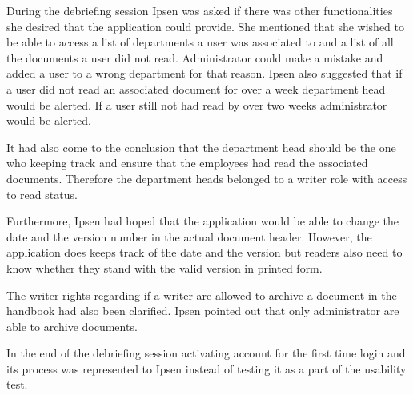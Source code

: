 
During the debriefing session Ipsen was asked if there was other functionalities she desired that the application could provide.
She mentioned that she wished to be able to access a list of departments a user was associated to and a list of all the documents a user did not read. 
Administrator could make a mistake and added a user to a wrong department for that reason. 
Ipsen also suggested that if a user did not read an associated document for over a week department head would be alerted.
If a user still not had read by over two weeks administrator would be alerted. 

It had also come to the conclusion that the department head should be the one who keeping track and ensure that the employees had read the associated documents. 
Therefore the department heads belonged to a writer role with access to read status. 

Furthermore, Ipsen had hoped that the application would be able to change the date and the version number in the actual document header. 
However, the application does keeps track of the date and the version but readers also need to know whether they stand with the valid version in printed form. 

The writer rights regarding if a writer are allowed to archive a document in the handbook had also been clarified. 
Ipsen pointed out that only administrator are able to archive documents. 

In the end of the debriefing session activating account for the first time login and its process was represented to Ipsen instead of testing it as a part of the usability test. 



